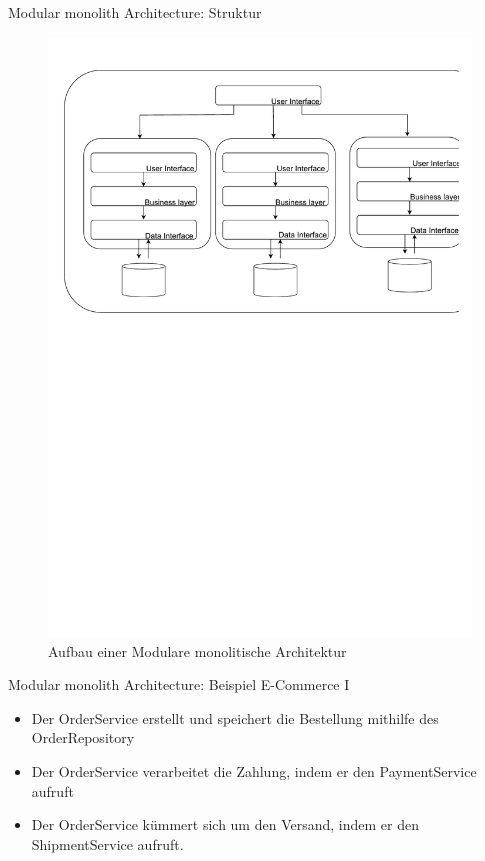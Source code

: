 \begin{frame}{Modular monolith Architecture: Struktur}
    \begin{figure}[!h]
        \centering
        \includegraphics[scale=0.55]{imglib/mono/modular-mono}
        \caption{Aufbau einer Modulare monolitische Architektur}
        \label{fig:microkernel}
    \end{figure}
\end{frame}
\begin{frame}{Modular monolith Architecture: Beispiel E-Commerce I}
    \begin{itemize}
        \item Der OrderService erstellt und speichert die Bestellung mithilfe des OrderRepository
        \item Der OrderService verarbeitet die Zahlung, indem er den PaymentService aufruft
        \item Der OrderService kümmert sich um den Versand, indem er den ShipmentService aufruft.
      \end{itemize}
\end{frame}

